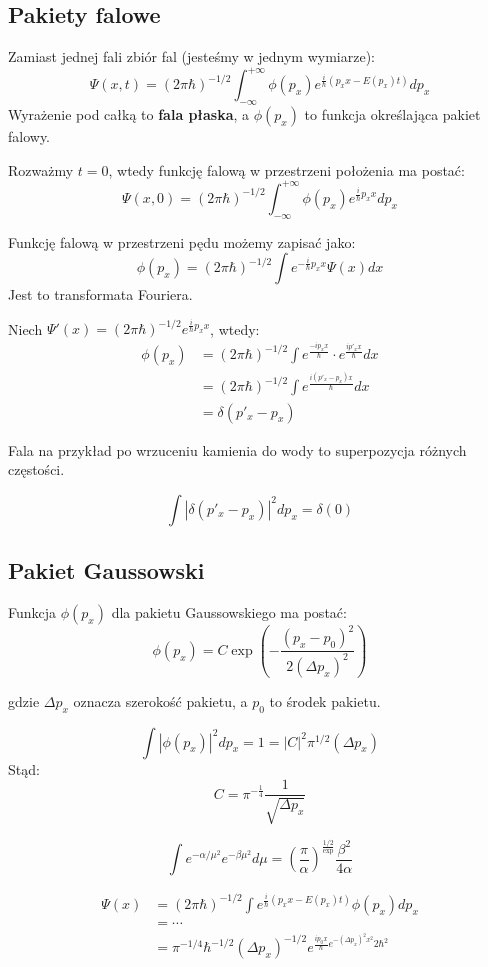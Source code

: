 \subsection{Pakiety falowe}
Zamiast jednej fali zbiór fal (jesteśmy w jednym wymiarze):
\[
\Psi(x,t) = (2\pi\hbar)^{-1/2} \int_{-\infty}^{+\infty} \phi(p_x) e^{\frac{i}{\hbar} (p_x x - E(p_x) t)} dp_x
\]
Wyrażenie pod całką to \textbf{fala płaska}, a $\phi(p_x)$ to funkcja określająca pakiet falowy.

Rozważmy $t = 0$, wtedy funkcję falową w przestrzeni położenia ma postać:
\[
\Psi(x,0) = (2\pi\hbar)^{-1/2} \int_{-\infty}^{+\infty} \phi(p_x) e^{\frac{i}{\hbar} p_x x} dp_x
\]

Funkcję falową w przestrzeni pędu możemy zapisać jako:
\[
\phi(p_x) = (2\pi\hbar)^{-1/2} \int e^{-\frac{i}{\hbar} p_x x} \Psi(x) dx
\]
Jest to transformata Fouriera.

Niech $\Psi'(x) = (2\pi\hbar)^{-1/2} e^{\frac{i}{\hbar} p_x x}$, wtedy:
\begin{align*}
\phi(p_x) &= (2\pi\hbar)^{-1/2} \int e^\frac{-ip_x x}{\hbar} \cdot e^\frac{ip'_x x}{\hbar} dx \\
&= (2\pi\hbar)^{-1/2} \int e^\frac{i(p'_x - p_x) x}{\hbar} dx \\
&= \delta(p'_x - p_x)
\end{align*}

Fala na przykład po wrzuceniu kamienia do wody to superpozycja różnych częstości.

\[
\int |\delta(p'_x - p_x)|^2 dp_x = \delta(0)
\]

\subsection{Pakiet Gaussowski}
Funkcja $\phi(p_x)$ dla pakietu Gaussowskiego ma postać:
\[
\phi(p_x) = C \exp \left( -\frac{(p_x - p_0)^2}{2 (\Delta p_x)^2} \right)
\]

gdzie $\Delta p_x$ oznacza szerokość pakietu, a $p_0$ to środek pakietu.

\[
\int |\phi(p_x)|^2 dp_x = 1 = |C|^2 \pi^{1/2} (\Delta p_x)
\]
Stąd:
\[
C = \pi^{-\frac{1}{4}} \frac{1}{\sqrt{\Delta p_x}}
\]

\[
\int e^{-\alpha/\mu^2} e^{-\beta \mu^2} d\mu = \left(\frac{\pi}{\alpha}\right)^\frac{1/2} \exp{\frac{\beta^2}{4\alpha}}
\]

\begin{align*}
\Psi(x) &= (2\pi\hbar)^{-1/2} \int e^{\frac{i}{\hbar} (p_x x - E(p_x) t)} \phi(p_x) dp_x \\
&= \cdots \\
&= \pi^{-1/4} \hbar^{-1/2} (\Delta p_x)^{-1/2} e^{\frac{ip_0 x}{\hbar} e^{-(\Delta p_x)^2 x^2}{2\hbar^2}}
\end{align*}

